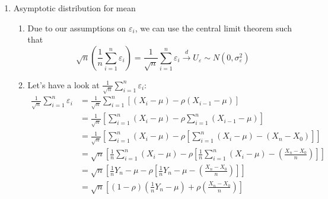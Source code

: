 \begin{Solution}{9.4}
\begin{enumerate}
  \item Asymptotic distribution for mean
  \begin{enumerate}
    \item Due to our assumptions on $\varepsilon_i$, we can use the central limit theorem such that
        \begin{equation*}
            \sqrt{n} \left(\frac{1}{n} \sum_{i=1}^n \varepsilon_i \right) = \frac{1}{\sqrt{n}} \sum_{i=1}^n \varepsilon_i  \overset{d}{\rightarrow} U_\varepsilon \sim N(0,\sigma_\varepsilon^2)
        \end{equation*}
    \item Let's have a look at $\frac{1}{\sqrt{n}} \sum_{i=1}^n \varepsilon_i$:
        \begin{align*}
        \frac{1}{\sqrt{n}} \sum_{i=1}^n \varepsilon_i
        &= \frac{1}{\sqrt{n}} \sum_{i=1}^n \left[(X_i-\mu)-\rho(X_{i-1}-\mu)\right]\\
        &= \frac{1}{\sqrt{n}} \left[\sum_{i=1}^n (X_i-\mu)- \rho\sum_{i=1}^n(X_{i-1}-\mu)\right]\\
        &= \frac{1}{\sqrt{n}} \left[\sum_{i=1}^n (X_i-\mu)- \rho\left[\sum_{i=1}^n(X_{i}-\mu)-(X_n - X_0)\right]\right]\\
        &= \sqrt{n} \left[\frac{1}{n}\sum_{i=1}^n (X_i-\mu)- \rho\left[\frac{1}{n}\sum_{i=1}^n(X_{i}-\mu)-\left(\frac{X_n - X_0}{n}\right)\right]\right]\\
        &= \sqrt{n} \left[\frac{1}{n}Y_n-\mu- \rho\left[\frac{1}{n}Y_n-\mu-\left(\frac{X_n - X_0}{n}\right)\right]\right]\\
        &= \sqrt{n}\left[(1-\rho)\left(\frac{1}{n}Y_n-\mu\right) + \rho\left(\frac{X_n - X_0}{n}\right)\right]
        \end{align*}


\end{enumerate}
\end{enumerate}
\end{Solution}
